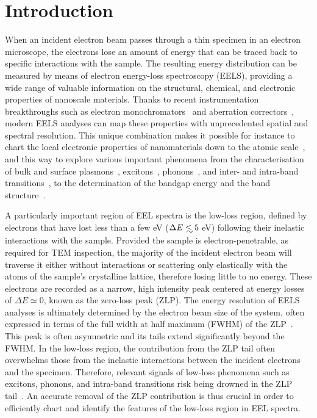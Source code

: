 \section{Introduction}
\label{sec:introduction}

When an incident electron beam passes through a thin specimen in an electron microscope, the electrons lose
an amount of energy that can be traced back to specific interactions with the sample.
%
The resulting energy distribution can be measured by means of electron energy-loss spectroscopy (EELS), 
providing a wide range of
valuable information on the structural, chemical, and electronic properties of nanoscale materials.
%
Thanks to recent instrumentation breakthroughs
such as electron monochromators~\cite{Terauchi:2005, Freitag:2005} and aberration correctors~\cite{Haider:1998},
modern EELS analyses can map these properties with unprecedented spatial and spectral resolution.
%
This unique combination makes it possible for instance to chart the local
 electronic properties of nanomaterials
 down to the atomic scale~\cite{Geiger:1967}, and this way to explore various
 important phenomena from the characterisation of bulk and surface plasmons~\cite{Daniels:2003, Schaffer:2008}, 
 excitons~\cite{Erni:2005},
  phonons~\cite{Ibach:1980}, and inter- and intra-band transitions~\cite{Rafferty:1998},
  to the determination of the bandgap energy and the band structure~\cite{Stoger:2008}.

A particularly important region of EEL spectra is
the low-loss region, defined by electrons that have lost
less than a few eV ($\Delta E\lsim 5$ eV) following their inelastic interactions
with the sample.
%
Provided the sample is electron-penetrable, as required for TEM inspection,
the majority of the incident electron beam will traverse it
either without interactions or scattering only elastically with the atoms
of the sample's crystalline lattice, therefore losing little to no energy.
%
These electrons are recorded as a narrow,
high intensity peak centered at energy losses
of $\Delta E\simeq 0$, known as the zero-loss peak (ZLP).
%
The energy resolution of EELS analyses is ultimately determined by
the electron beam size of the system, often expressed in terms
of the full width at half maximum (FWHM) of the
ZLP~\cite{Egerton:2009}.
%
This peak is often asymmetric and its tails extend significantly 
beyond the FWHM. 
%
In the low-loss region, the contribution from the ZLP tail
often overwhelms those from the inelastic interactions between
the incident electrons and the specimen.
%
Therefore, relevant signals of low-loss phenomena such as excitons,
phonons, and intra-band transitions risk being drowned
in the ZLP tail~\cite{Abajo:2010}.
%
An accurate removal of the ZLP
contribution is thus crucial  in order to efficiently chart and identify the features
of the low-loss region in EEL spectra. 

